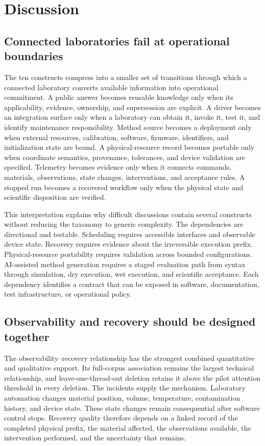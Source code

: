 \section{Discussion}
\label{sec:discussion}

\subsection{Connected laboratories fail at operational boundaries}

The ten constructs compress into a smaller set of transitions through which a connected laboratory converts available information into operational commitment. A public answer becomes reusable knowledge only when its applicability, evidence, ownership, and supersession are explicit. A driver becomes an integration surface only when a laboratory can obtain it, invoke it, test it, and identify maintenance responsibility. Method source becomes a deployment only when external resources, calibration, software, firmware, identifiers, and initialization state are bound. A physical-resource record becomes portable only when coordinate semantics, provenance, tolerances, and device validation are specified. Telemetry becomes evidence only when it connects commands, materials, observations, state changes, interventions, and acceptance rules. A stopped run becomes a recovered workflow only when the physical state and scientific disposition are verified.

This interpretation explains why difficult discussions contain several constructs without reducing the taxonomy to generic complexity. The dependencies are directional and testable. Scheduling requires accessible interfaces and observable device state. Recovery requires evidence about the irreversible execution prefix. Physical-resource portability requires validation across bounded configurations. AI-assisted method generation requires a staged evaluation path from syntax through simulation, dry execution, wet execution, and scientific acceptance. Each dependency identifies a contract that can be exposed in software, documentation, test infrastructure, or operational policy.

\subsection{Observability and recovery should be designed together}

The observability--recovery relationship has the strongest combined quantitative and qualitative support. Its full-corpus association remains the largest technical relationship, and leave-one-thread-out deletion retains it above the pilot attention threshold in every deletion. The incidents supply the mechanism. Laboratory automation changes material position, volume, temperature, contamination history, and device state. These state changes remain consequential after software control stops. Recovery quality therefore depends on a linked record of the completed physical prefix, the material affected, the observations available, the intervention performed, and the uncertainty that remains.

